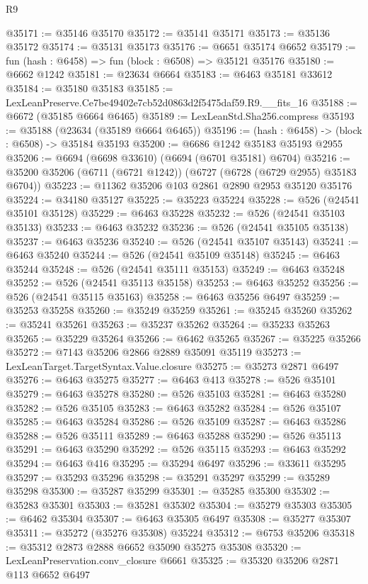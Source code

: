 \begin{lexlean}{R9}
\begin{coremodule}
@35171 := @35146 @35170
@35172 := @35141 @35171
@35173 := @35136 @35172
@35174 := @35131 @35173
@35176 := @6651 @35174 @6652
@35179 := fun (hash : @6458) => fun (block : @6508) => @35121 @35176
@35180 := @6662 @1242
@35181 := @23634 @6664
@35183 := @6463 @35181 @33612
@35184 := @35180 @35183
@35185 := LexLeanPreserve.Ce7be49402e7cb52d0863d2f5475daf59.R9.__fits_16
@35188 := @6672 (@35185 @6664 @6465)
@35189 := LexLeanStd.Sha256.compress
@35193 := @35188 (@23634 (@35189 @6664 @6465))
@35196 := (hash : @6458) -> (block : @6508) -> @35184 @35193
@35200 := @6686 @1242 @35183 @35193 @2955
@35206 := @6694 (@6698 @33610) (@6694 (@6701 @35181) @6704)
@35216 := @35200 @35206 (@6711 (@6721 @1242)) (@6727 (@6728 (@6729 @2955) @35183 @6704))
@35223 := @11362 @35206 @103 @2861 @2890 @2953 @35120 @35176
@35224 := @34180 @35127
@35225 := @35223 @35224
@35228 := @526 (@24541 @35101 @35128)
@35229 := @6463 @35228
@35232 := @526 (@24541 @35103 @35133)
@35233 := @6463 @35232
@35236 := @526 (@24541 @35105 @35138)
@35237 := @6463 @35236
@35240 := @526 (@24541 @35107 @35143)
@35241 := @6463 @35240
@35244 := @526 (@24541 @35109 @35148)
@35245 := @6463 @35244
@35248 := @526 (@24541 @35111 @35153)
@35249 := @6463 @35248
@35252 := @526 (@24541 @35113 @35158)
@35253 := @6463 @35252
@35256 := @526 (@24541 @35115 @35163)
@35258 := @6463 @35256 @6497
@35259 := @35253 @35258
@35260 := @35249 @35259
@35261 := @35245 @35260
@35262 := @35241 @35261
@35263 := @35237 @35262
@35264 := @35233 @35263
@35265 := @35229 @35264
@35266 := @6462 @35265
@35267 := @35225 @35266
@35272 := @7143 @35206 @2866 @2889 @35091 @35119
@35273 := LexLeanTarget.TargetSyntax.Value.closure
@35275 := @35273 @2871 @6497
@35276 := @6463 @35275
@35277 := @6463 @413
@35278 := @526 @35101
@35279 := @6463 @35278
@35280 := @526 @35103
@35281 := @6463 @35280
@35282 := @526 @35105
@35283 := @6463 @35282
@35284 := @526 @35107
@35285 := @6463 @35284
@35286 := @526 @35109
@35287 := @6463 @35286
@35288 := @526 @35111
@35289 := @6463 @35288
@35290 := @526 @35113
@35291 := @6463 @35290
@35292 := @526 @35115
@35293 := @6463 @35292
@35294 := @6463 @416
@35295 := @35294 @6497
@35296 := @33611 @35295
@35297 := @35293 @35296
@35298 := @35291 @35297
@35299 := @35289 @35298
@35300 := @35287 @35299
@35301 := @35285 @35300
@35302 := @35283 @35301
@35303 := @35281 @35302
@35304 := @35279 @35303
@35305 := @6462 @35304
@35307 := @6463 @35305 @6497
@35308 := @35277 @35307
@35311 := @35272 (@35276 @35308) @35224
@35312 := @6753 @35206
@35318 := @35312 @2873 @2888 @6652 @35090 @35275 @35308
@35320 := LexLeanPreservation.conv_closure @6661
@35325 := @35320 @35206 @2871 @113 @6652 @6497

\end{coremodule}
\end{lexlean}
